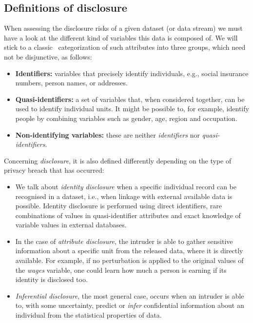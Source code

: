 \subsection{Definitions of disclosure}
\label{Theory:SDC:DisclosureTypes}

When assessing the disclosure risks of a given dataset (or data stream) we must have a look at the different kind of variables this data is composed of. We will stick to a classic~\citep{Templ:IntroSDC} categorization of such attributes into three groups, which need not be disjunctive, as follows:

\begin{itemize}
	\item \textbf{Identifiers:} variables that precisely identify individuals, e.g., social insurance numbers, person names, or addresses.
	\item \textbf{Quasi-identifiers:} a set of variables that, when considered together, can be used to identify individual units. It might be possible to, for example, identify people by combining variables such as gender, age, region and occupation.
	\item \textbf{Non-identifying variables:} these are neither \textit{identifiers} nor \textit{quasi-identifiers}.
\end{itemize}

Concerning \textit{disclosure}, it is also defined differently depending on the type of privacy breach that has occurred:

\begin{itemize}
	\item We talk about \textit{identity disclosure} when a specific individual record can be recognised in a dataset, i.e., when linkage with external available data is possible. Identity disclosure is performed using direct identifiers, rare combinations of values in quasi-identifier attributes and exact knowledge of variable values in external databases.
	\item In the case of \textit{attribute disclosure}, the intruder is able to gather sensitive information about a specific unit from the released data, where it is directly available. For example, if no perturbation is applied to the original values of the \textit{wages} variable, one could learn how much a person is earning if its identity is disclosed too.
	\item \textit{Inferential disclosure}, the most general case, occurs when an intruder is able to, with some uncertainty, predict or \textit{infer} confidential information about an individual from the statistical properties of data.
\end{itemize}

